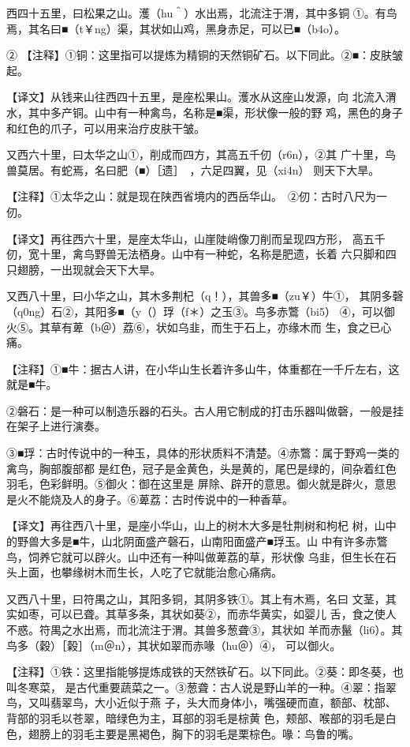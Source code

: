 \documentclass[a4paper,12pt,UTF8,twoside]{ctexbook}
\begin{document}
西四十五里，曰松果之山。濩（hu＾）水出焉，北流注于渭，其中多铜 ①。有鸟焉，其名曰■（t￥ng）渠，其状如山鸡，黑身赤足，可以已■（b4o）。

② 【注释】①铜：这里指可以提炼为精铜的天然铜矿石。以下同此。②■：皮肤皱起。

【译文】从钱来山往西四十五里，是座松果山。濩水从这座山发源，向 北流入渭水，其中多产铜。山中有一种禽鸟，名称是■渠，形状像一般的野 鸡，黑色的身子和红色的爪子，可以用来治疗皮肤干皱。

又西六十里，曰太华之山①，削成而四方，其高五千仞（r6n），②其 广十里，鸟兽莫居。有蛇焉，名曰肥（■）［遗］　，六足四翼，见（xi4n） 则天下大旱。

【注释】①太华之山：就是现在陕西省境内的西岳华山。　②仞：古时八尺为一仞。

【译文】再往西六十里，是座太华山，山崖陡峭像刀削而呈现四方形， 高五千仞，宽十里，禽鸟野兽无法栖身。山中有一种蛇，名称是肥遗，长着 六只脚和四只翅膀，一出现就会天下大旱。

又西八十里，曰小华之山，其木多荆杞（q！），其兽多■（zu￥）牛①， 其阴多磬（q0ng）石②，其阳多■（y（）琈（f＊）之玉③。鸟多赤鷩（bi5） ④，可以御火⑤。其草有萆（b＠）荔⑥，状如乌韭，而生于石上，亦缘木而 生，食之已心痛。

【注释】①■牛：据古人讲，在小华山生长着许多山牛，体重都在一千斤左右，这就是■牛。

②磐石：是一种可以制造乐器的石头。古人用它制成的打击乐器叫做磬，一般是挂在架子上进行演奏。

③■琈：古时传说中的一种玉，具体的形状质料不清楚。④赤鷩：属于野鸡一类的禽鸟，胸部腹部都 是红色，冠子是金黄色，头是黄的，尾巴是绿的，间杂着红色羽毛，色彩鲜明。⑤御火：御在这里是 屏除、辟开的意思。御火就是辟火，意思是火不能烧及人的身子。⑥萆荔：古时传说中的一种香草。

【译文】再往西八十里，是座小华山，山上的树木大多是牡荆树和枸杞 树，山中的野兽大多是■牛，山北阴面盛产磬石，山南阳面盛产■琈玉。山 中有许多赤鷩鸟，饲养它就可以辟火。山中还有一种叫做萆荔的草，形状像 乌韭，但生长在石头上面，也攀缘树木而生长，人吃了它就能治愈心痛病。

又西八十里，曰符禺之山，其阳多铜，其阴多铁①。其上有木焉，名曰 文茎，其实如枣，可以已聋。其草多条，其状如葵②，而赤华黄实，如婴儿 舌，食之使人不惑。符禺之水出焉，而北流注于渭。其兽多葱聋③，其状如 羊而赤鬣（li6）。其鸟多（穀）［榖］（m＠n），其状如翠而赤喙（hu＠）④， 可以御火。

【注释】①铁：这里指能够提炼成铁的天然铁矿石。以下同此。②葵：即冬葵，也叫冬寒菜， 是古代重要蔬菜之一。③葱聋：古人说是野山羊的一种。④翠：指翠鸟，又叫翡翠鸟，大小近似于燕 子，头大而身体小，嘴强硬而直，额部、枕部、背部的羽毛以苍翠，暗绿色为主，耳部的羽毛是棕黄 色，颊部、喉部的羽毛是白色，翅膀上的羽毛主要是黑褐色，胸下的羽毛是栗棕色。喙：鸟鲁的嘴。
\end{document}

